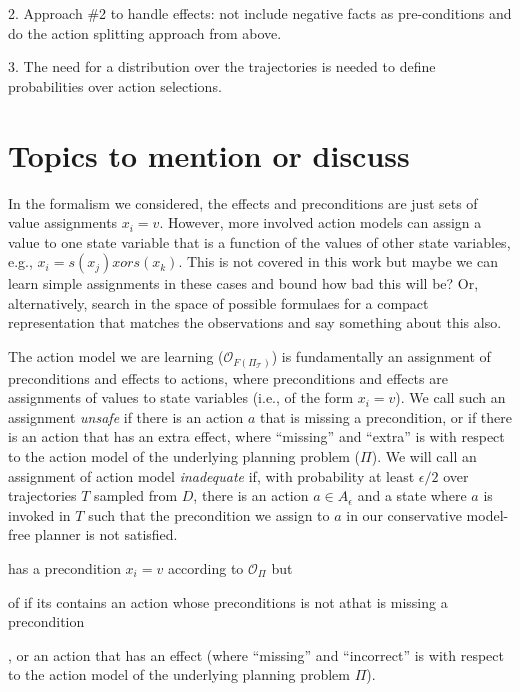 2. Approach \#2 to handle effects: not include negative facts as pre-conditions
and do the action splitting approach from above. 


3. The need for a distribution over the trajectories is needed
to define probabilities over action selections. 




\section{Topics to mention or discuss}
In the \SAS{} formalism we considered, the effects and preconditions 
are just sets of value assignments $x_i=v$. However, more involved 
action models can assign a value to one state variable 
that is a function of the values of other state variables, 
e.g., $x_i=s(x_j) xor s(x_k)$. This is not covered in this work
but maybe we can learn simple assignments in these cases and bound how bad this will be?
Or, alternatively, search in the space of possible formulaes for a compact representation
that matches the observations and say something about this also.  






The action model we are learning ($\mathcal{O}_{F(\Pi_\mathcal{T})}$) is fundamentally an assignment of preconditions and effects to actions, where preconditions and effects are assignments of values to state variables (i.e., of the form $x_i=v$). We call such an assignment {\em unsafe} if 
there is an action $a$ that is missing a precondition, 
or if there is an action that has an extra effect, where ``missing'' and ``extra'' 
is with respect to the action model of the underlying planning problem ($\Pi$). 
We will call an assignment of action model {\em inadequate} if, with probability at least $\epsilon/2$ over trajectories $T$ sampled from $D$, 
there is an action $a\in A_\epsilon$ and a state where $a$ is invoked in $T$ such that the precondition we assign to $a$ in our conservative model-free planner is not satisfied. 




has a precondition $x_i=v$ according to $\mathcal{O}_\Pi$ 
but 

of 
if its contains an action 
whose preconditions is not athat is missing a precondition

, or an action that has an effect (where ``missing'' and ``incorrect'' is with respect to the action model of the underlying planning problem $\Pi$). 


